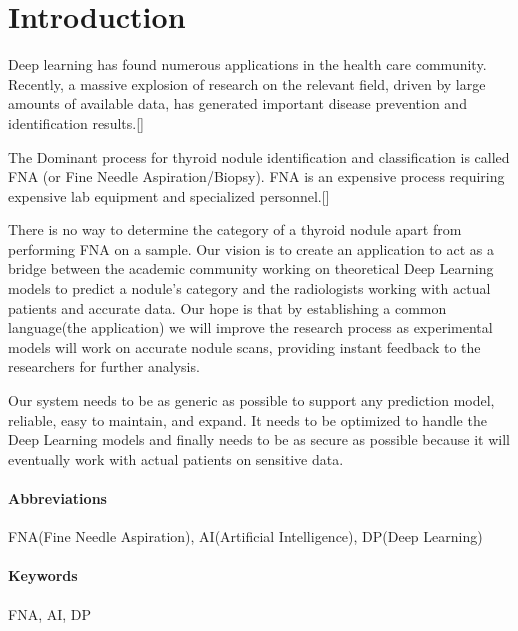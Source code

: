 \chapter{Introduction}
\label{1}

Deep learning has found numerous applications in the health care community. Recently, a massive explosion of research on the relevant field, 
driven by large amounts of available data, has generated important disease prevention and identification results.[\cite{ai-applications}] \par

The Dominant process for thyroid nodule identification and classification is called FNA (or Fine Needle Aspiration/Biopsy). 
FNA is an expensive process requiring expensive lab equipment and specialized personnel.[\cite{fna-proccess}]\par

There is no way to determine the category of a thyroid nodule apart from performing FNA on a sample. Our vision is to create an application to act as a bridge between the academic community working on theoretical Deep Learning models to predict a
nodule's category and the radiologists working with actual patients and accurate data. Our hope is that by establishing a common language(the application) 
we will improve the research process as experimental models will work on accurate nodule scans, providing instant feedback to the researchers for further analysis.\par

Our system needs to be as generic as possible to support any prediction model, reliable, easy to maintain, and expand. 
It needs to be optimized to handle the Deep Learning models and finally needs to be as secure as possible because it will eventually work with actual patients on sensitive data.\par

\subsubsection{Abbreviations}FNA(Fine Needle Aspiration), AI(Artificial Intelligence), DP(Deep Learning)
\subsubsection{Keywords}FNA, AI, DP


